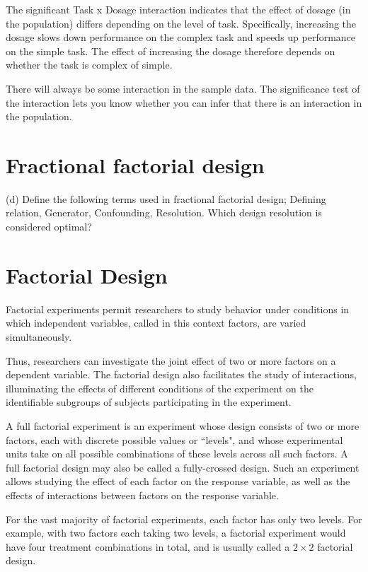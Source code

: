 The significant Task x Dosage interaction indicates that the effect of dosage (in the population) differs depending on the level of task. Specifically, increasing the dosage slows down performance on the complex task and speeds up performance on the simple task. The effect of increasing the dosage therefore depends on whether the task is complex of simple.

There will always be some interaction in the sample data. The significance test of the interaction lets you know whether you can infer that there is an interaction in the population.



\section{Fractional factorial design}

(d)	Define the following terms used in fractional factorial design; Defining relation,
Generator, Confounding, Resolution. Which design resolution is considered
optimal?
\section{Factorial Design}
Factorial experiments permit researchers to study behavior under conditions in which independent variables, called in this context factors, are varied simultaneously.

Thus, researchers can investigate the joint effect of two or more factors on a dependent variable. The factorial design also facilitates the study of interactions, illuminating the effects of different conditions of the experiment on the identifiable subgroups of subjects participating in the experiment.


A full factorial experiment is an experiment whose design consists of two or more factors, each with discrete possible values or ``levels", and whose experimental units take on all possible combinations of these levels across all such factors. A full factorial design may also be called a fully-crossed design. Such an experiment allows studying the effect of each factor on the response variable, as well as the effects of interactions between factors on the response variable.

For the vast majority of factorial experiments, each factor has only two levels. For example, with two factors each taking two levels, a factorial experiment would have four treatment combinations in total, and is usually called a $2\times2$ factorial design.

